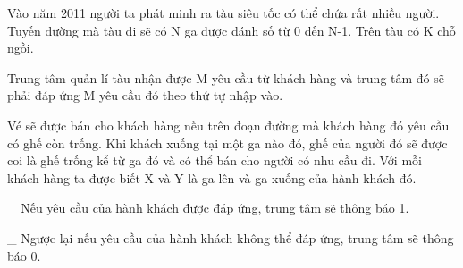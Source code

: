 Vào năm 2011 người ta phát minh ra tàu siêu tốc có thể chứa rất nhiều người. Tuyến đường mà tàu đi sẽ có N ga được đánh số từ 0 đến N-1. Trên tàu có K chỗ ngồi.  

   Trung tâm quản lí tàu nhận được M yêu cầu từ khách hàng và trung tâm đó sẽ phải đáp ứng M yêu cầu đó theo thứ tự nhập vào.  

   Vé sẽ được bán cho khách hàng nếu trên đoạn đường mà khách hàng đó yêu cầu có ghế còn trống. Khi khách xuống tại một ga nào đó, ghế của người đó sẽ được coi là ghế trống kể từ ga đó và có thể bán cho người có nhu cầu đi. Với mỗi khách hàng ta được biết X và Y là ga lên và ga xuống của hành khách đó.  

   \_ Nếu yêu cầu của hành khách được đáp ứng, trung tâm sẽ thông báo 1.  

   \_ Ngược lại nếu yêu cầu của hành khách không thể đáp ứng, trung tâm sẽ thông báo 0.  

\